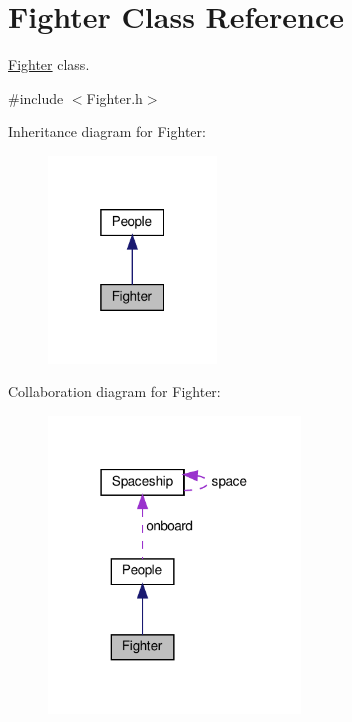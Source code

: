 \hypertarget{classFighter}{}\section{Fighter Class Reference}
\label{classFighter}


\hyperlink{classFighter}{Fighter} class.  




{\ttfamily \#include $<$Fighter.\+h$>$}



Inheritance diagram for Fighter\+:\nopagebreak
\begin{figure}[H]
\begin{center}
\leavevmode
\includegraphics[width=127pt]{classFighter__inherit__graph}
\end{center}
\end{figure}


Collaboration diagram for Fighter\+:\nopagebreak
\begin{figure}[H]
\begin{center}
\leavevmode
\includegraphics[width=190pt]{classFighter__coll__graph}
\end{center}
\end{figure}

